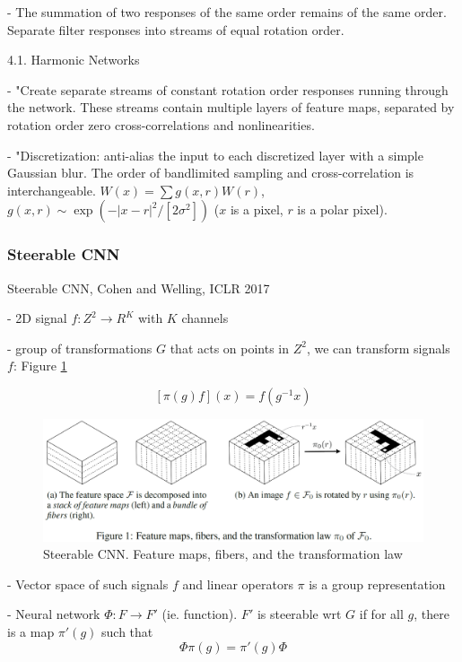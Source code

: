 \documentclass[english]{article}
\begin{document}
- The summation of two responses of the same order remains of the same order. Separate filter responses into
streams of equal rotation order.

\item 4.1. Harmonic Networks

- "Create separate streams of constant rotation order responses running through the network. These streams contain multiple layers of feature maps, separated
by rotation order zero cross-correlations and nonlinearities.

- "Discretization: anti-alias the input to each discretized layer with a simple Gaussian blur. The order of bandlimited sampling and cross-correlation is interchangeable. $W(x) = \sum g(x,r) W(r)$, $g(x,r)\sim \exp(-|x-r|^2/[2\sigma^2])$ ($x$ is a pixel, $r$ is a polar pixel).

\eenum




\subsubsection{Steerable CNN}
\benum 

\item Steerable CNN, Cohen and Welling, ICLR 2017

- 2D signal $f : Z^2 \to R^K$ with $K$ channels

- group of transformations $G$ that acts on points in $Z^2$, we can transform signals $f$: Figure \ref{steer_cnn}

$$[\pi(g)f](x) = f(g^{-1}x)$$

\begin{figure}
  \centering
  \includegraphics[scale=0.5]{steer_cnn.png}
    \caption{Steerable CNN. Feature maps, fibers, and the transformation law}
    \label{steer_cnn}
\end{figure}



- Vector space of such signals $f$ and linear operators $\pi$ is a group representation

- Neural network $\Phi:F\to F'$ (ie. function). $F'$ is steerable wrt $G$ if for all $g$, there is a map $\pi'(g)$ such that $$\Phi \pi (g) = \pi'(g)\Phi$$
\end{document}
